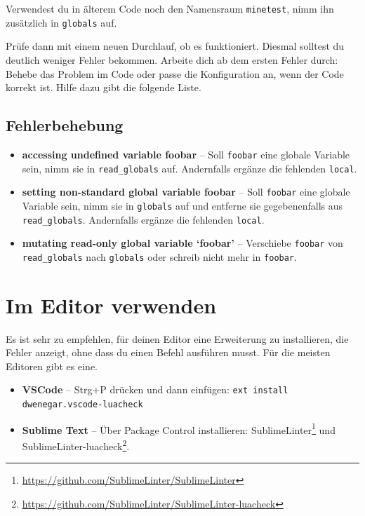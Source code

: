 Verwendest du in älterem Code noch den
Namensraum \texttt{minetest}, nimm ihn
zusätzlich in \texttt{globals} auf.

Prüfe dann mit einem neuen Durchlauf, ob es funktioniert. Diesmal
solltest du deutlich weniger Fehler bekommen. Arbeite dich ab dem ersten
Fehler durch: Behebe das Problem im Code oder passe die Konfiguration
an, wenn der Code korrekt ist. Hilfe dazu gibt die folgende Liste.

\subsection{Fehlerbehebung}\label{fehlerbehebung}

\begin{itemize}
\tightlist
\item
  \textbf{accessing undefined variable foobar} -- Soll \texttt{foobar}
  eine globale Variable sein, nimm sie in
  \texttt{read\_\allowbreak{}globals} auf. Andernfalls ergänze die
  fehlenden \texttt{local}.
\item
  \textbf{setting non-standard global variable foobar} -- Soll
  \texttt{foobar} eine globale Variable sein, nimm sie in
  \texttt{globals} auf und entferne sie gegebenenfalls aus
  \texttt{read\_\allowbreak{}globals}. Andernfalls ergänze die fehlenden
  \texttt{local}.
\item
  \textbf{mutating read-only global variable `foobar'} -- Verschiebe
  \texttt{foobar} von \texttt{read\_\allowbreak{}globals} nach
  \texttt{globals} oder schreib nicht mehr in \texttt{foobar}.
\end{itemize}

\section{Im Editor verwenden}\label{im-editor-verwenden}

Es ist sehr zu empfehlen, für deinen Editor eine Erweiterung zu
installieren, die Fehler anzeigt, ohne dass du einen Befehl ausführen
musst. Für die meisten Editoren gibt es eine.

\begin{itemize}
\tightlist
\item
  \textbf{VSCode} -- Strg+P drücken und dann einfügen:
  \texttt{ext install dwenegar.\allowbreak{}vscode-luacheck}
\item
  \textbf{Sublime Text} -- Über Package Control installieren:
  SublimeLinter\footnote{\url{https://github.com/SublimeLinter/SublimeLinter}}
  und SublimeLinter-luacheck\footnote{\url{https://github.com/SublimeLinter/SublimeLinter-luacheck}}.
\end{itemize}
